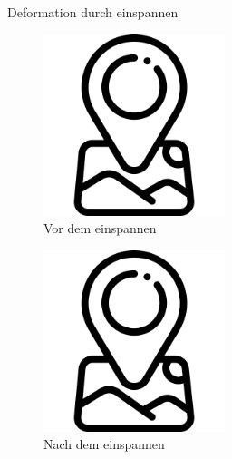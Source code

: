 \documentclass[../slides.tex]{subfiles}
\begin{document}
\begin{frame}{Deformation durch einspannen}
  \begin{minipage}[h]{.40\textwidth}
    \begin{figure}[]
      \includegraphics[height=150pt]{img_niklas/before_clamping.png}
      \caption[short]{Vor dem einspannen}
    \end{figure}
  \end{minipage}
  \hfill
  \begin{minipage}[h]{.40\textwidth}
    \begin{figure}[]
      \includegraphics[height=150pt]{img_niklas/after_clamping.png}
      \caption[short]{Nach dem einspannen}
    \end{figure}
  \end{minipage}
\end{frame}
\end{document}
